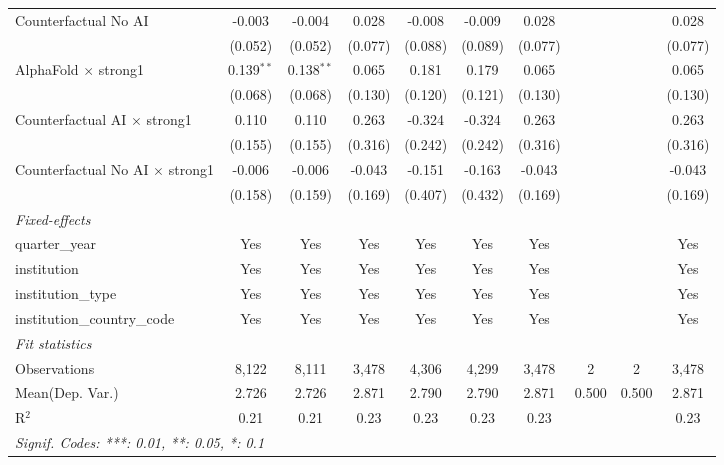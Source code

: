 \begin{tabular}{lccccccccc}
   Counterfactual No AI                   & -0.003        & -0.004        & 0.028   & -0.008       & -0.009      & 0.028   &     &     & 0.028\\   
                                          & (0.052)       & (0.052)       & (0.077) & (0.088)      & (0.089)     & (0.077) &     &     & (0.077)\\   
   AlphaFold $\times$ strong1             & 0.139$^{**}$  & 0.138$^{**}$  & 0.065   & 0.181        & 0.179       & 0.065   &     &     & 0.065\\   
                                          & (0.068)       & (0.068)       & (0.130) & (0.120)      & (0.121)     & (0.130) &     &     & (0.130)\\   
   Counterfactual AI $\times$ strong1     & 0.110         & 0.110         & 0.263   & -0.324       & -0.324      & 0.263   &     &     & 0.263\\   
                                          & (0.155)       & (0.155)       & (0.316) & (0.242)      & (0.242)     & (0.316) &     &     & (0.316)\\   
   Counterfactual No AI $\times$ strong1  & -0.006        & -0.006        & -0.043  & -0.151       & -0.163      & -0.043  &     &     & -0.043\\   
                                          & (0.158)       & (0.159)       & (0.169) & (0.407)      & (0.432)     & (0.169) &     &     & (0.169)\\   
   \midrule
   \emph{Fixed-effects}\\
   quarter\_year                          & Yes           & Yes           & Yes     & Yes          & Yes         & Yes     &     &     & Yes\\  
   institution                            & Yes           & Yes           & Yes     & Yes          & Yes         & Yes     &     &     & Yes\\  
   institution\_type                      & Yes           & Yes           & Yes     & Yes          & Yes         & Yes     &     &     & Yes\\  
   institution\_country\_code             & Yes           & Yes           & Yes     & Yes          & Yes         & Yes     &     &     & Yes\\  
   \midrule
   \emph{Fit statistics}\\
   Observations                           & 8,122         & 8,111         & 3,478   & 4,306        & 4,299       & 3,478   & 2   & 2   & 3,478\\  
Mean(Dep. Var.) & 2.726 & 2.726 & 2.871 & 2.790 & 2.790 & 2.871 & 0.500 & 0.500 & 2.871 \\
   R$^2$                                  & 0.21          & 0.21          & 0.23    & 0.23         & 0.23        & 0.23    &     &     & 0.23\\  
   \midrule \midrule
   \multicolumn{10}{l}{\emph{Signif. Codes: ***: 0.01, **: 0.05, *: 0.1}}\\
\end{tabular}
\par\endgroup
